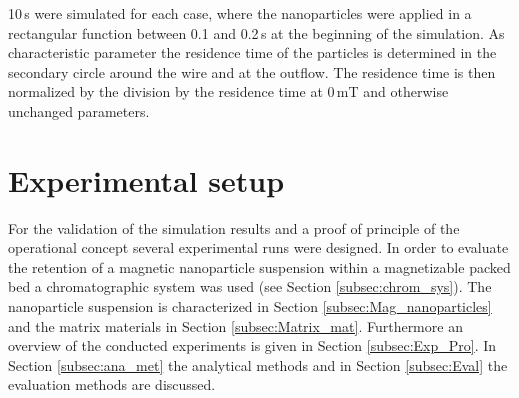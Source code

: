 10\,s were simulated for each case, where the nanoparticles were applied in a rectangular function between 0.1 and 0.2\,s at the beginning of the simulation. 
As characteristic parameter the residence time of the particles is determined in the secondary circle around the wire and at the outflow. The residence time is then normalized by the division by the residence time at 0\,mT and otherwise unchanged parameters.    
% 

\section{Experimental setup}
\label{sec:Exp_setup}
For the validation of the simulation results and a proof of principle of the operational concept several experimental runs were designed. In order to evaluate the retention of a magnetic nanoparticle suspension within a magnetizable packed bed a chromatographic system was used (see Section \ref{subsec:chrom_sys}). The nanoparticle suspension is characterized in Section \ref{subsec:Mag_nanoparticles} and the matrix materials in Section \ref{subsec:Matrix_mat}. Furthermore an overview of the conducted experiments is given in Section \ref{subsec:Exp_Pro}. In Section \ref{subsec:ana_met} the analytical methods and in Section \ref{subsec:Eval} the evaluation methods are discussed.    


